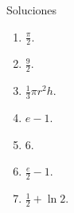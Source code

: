 \documentclass[original_version/main.tex]{subfiles}
\begin{document}
\begin{frame}{Soluciones}
\begin{enumerate}\item $\displaystyle\frac\pi2$.\item $\displaystyle\frac92$.\item $\displaystyle\frac13\pi r^2h$.\item $e-1$.\item $6$.\item $\displaystyle\frac e2-1$.\item $\displaystyle\frac12+\ln2$.\end{enumerate}
\end{frame}
\end{document}

